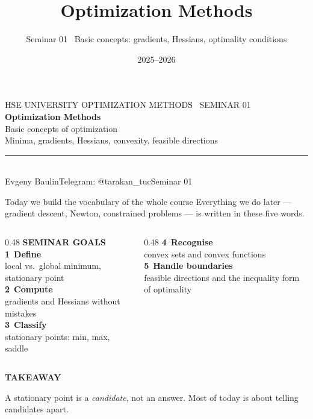 \documentclass[aspectratio=169,11pt]{beamer}
\title{Optimization Methods}
\subtitle{Seminar 01 \textperiodcentered\ Basic concepts: gradients, Hessians, optimality conditions}
\author{\presenter}
\institute{HSE University, Faculty of Computer Science}
\date{2025--2026}
\makeatletter
\newcommand{\presenter}{Evgeny Baulin}
\newcommand{\contact}{Telegram: @tarakan\_tuc}
\newcommand{\seminardate}{Seminar 01}
\newcommand{\kicker}[1]{{\color{hseaccent}\scriptsize\bfseries\MakeUppercase{#1}}}
\newcommand{\takeaway}[2]{%
  \par\smallskip\noindent
  \colorbox{hselight}{\parbox{\dimexpr\textwidth-2\fboxsep}{%
    \kicker{#1}\par\vspace{0.12em}\footnotesize #2}}\par}
\newcommand{\num}[1]{{\color{hseaccent}\bfseries #1}}
\makeatother
\begin{document}
\begin{frame}[plain]
  \vspace{1.2em}
  {\color{hsegray}\scriptsize HSE UNIVERSITY \quad\textbar\quad OPTIMIZATION METHODS
    \textperiodcentered\ SEMINAR 01}\\[1.6em]
  {\color{hseblue}\Huge\bfseries Optimization Methods}\\[0.5em]
  {\color{hseblue}\Large Basic concepts of optimization}\\[0.4em]
  {\color{hsegray}\large Minima, gradients, Hessians, convexity, feasible directions}\\[1.4em]
  {\color{hseaccent}\rule{4em}{2pt}}\\[1.2em]
  {\small \presenter \quad\textbar\quad \contact \quad\textbar\quad \seminardate}
\end{frame}

\begin{frame}{Today we build the vocabulary of the whole course}
  {Everything we do later --- gradient descent, Newton, constrained problems --- is written in these five words.}
  \vspace{0.4em}
  \begin{columns}[T,onlytextwidth]
    \begin{column}{0.48\textwidth}
      \kicker{seminar goals}\\[0.5em]
      \num{1}\ \textbf{Define} \hfill\\ {\small local vs.\ global minimum, stationary point}\\[0.45em]
      \num{2}\ \textbf{Compute} \hfill\\ {\small gradients and Hessians without mistakes}\\[0.45em]
      \num{3}\ \textbf{Classify} \hfill\\ {\small stationary points: min, max, saddle}
    \end{column}
    \begin{column}{0.48\textwidth}
      \vspace{2.05em}
      \num{4}\ \textbf{Recognise} \hfill\\ {\small convex sets and convex functions}\\[0.45em]
      \num{5}\ \textbf{Handle boundaries} \hfill\\ {\small feasible directions and the inequality form of optimality}
    \end{column}
  \end{columns}
  \vspace{0.5em}
  \takeaway{takeaway}{A stationary point is a \emph{candidate}, not an answer. Most of today is about telling
    candidates apart.}
\end{frame}
\end{document}
